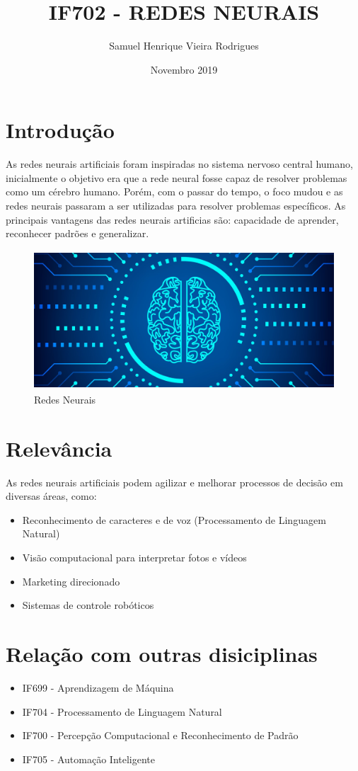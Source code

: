 \documentclass{article}
\title{IF702 - REDES NEURAIS}
\author{Samuel Henrique Vieira Rodrigues}
\date{Novembro 2019}
\begin{document}
\maketitle

\section{Introdução}
As redes neurais artificiais foram inspiradas no sistema nervoso central humano, inicialmente o objetivo era que a rede neural fosse capaz de resolver problemas como um cérebro humano. Porém, com o passar do tempo, o foco mudou e as redes neurais passaram a ser utilizadas para resolver problemas específicos. As principais vantagens das redes neurais artificias são: capacidade de aprender, reconhecer padrões e generalizar.

\begin{figure}[h!]
\centering
\includegraphics[height=5.2cm]{redes-neurais.jpg}
\caption{Redes Neurais}
\label{fig:redes-neurais}
\end{figure}

\section{Relevância}
As redes neurais artificiais podem agilizar e melhorar processos de decisão em diversas áreas, como:
\begin{itemize}
    \item Reconhecimento de caracteres e de voz (Processamento de Linguagem Natural)
    \item Visão computacional para interpretar fotos e vídeos
    \item Marketing direcionado
    \item Sistemas de controle robóticos
\end{itemize}

\section{Relação com outras disiciplinas}
\begin{itemize}
    \item IF699 - Aprendizagem de Máquina
    \item IF704 - Processamento de Linguagem Natural
    \item IF700 - Percepção Computacional e Reconhecimento de Padrão
    \item IF705 - Automação Inteligente
\end{itemize}



\end{document}

